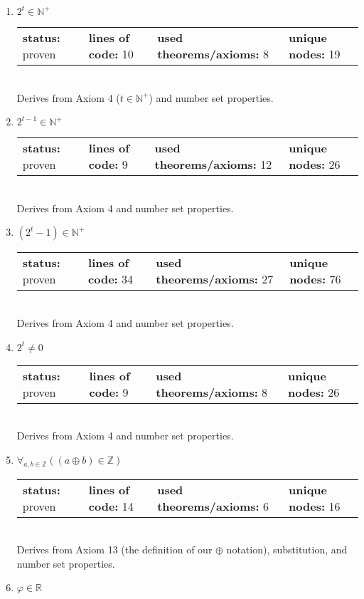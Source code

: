\documentclass{article}[12pt]
\begin{document}
\begin{enumerate}
\item $2^{t} \in \mathbb{N}^+$ \hfill \\
  \begin{tabular}{l | l | l | l}
    \textbf{status:} proven & \textbf{lines of code:} 10 & \textbf{used theorems/axioms:} 8 & \textbf{unique nodes:} 19
  \end{tabular} \hfill \\
  Derives from Axiom 4 ($t \in \mathbb{N}^+$) and number set properties.
\item $2^{t - 1} \in \mathbb{N}^+$ \hfill \\
  \begin{tabular}{l | l | l | l}
    \textbf{status:} proven & \textbf{lines of code:} 9 & \textbf{used theorems/axioms:} 12 & \textbf{unique nodes:} 26
  \end{tabular} \hfill \\
  Derives from Axiom 4 and number set properties.
\item $\left(2^{t} - 1\right) \in \mathbb{N}^+$ \hfill \\
  \begin{tabular}{l | l | l | l}
    \textbf{status:} proven & \textbf{lines of code:} 34 & \textbf{used theorems/axioms:} 27 & \textbf{unique nodes:} 76
  \end{tabular} \hfill \\
  Derives from Axiom 4 and number set properties.
\item $2^{t} \neq 0$ \hfill \\
  \begin{tabular}{l | l | l | l}
    \textbf{status:} proven & \textbf{lines of code:} 9 & \textbf{used theorems/axioms:} 8 & \textbf{unique nodes:} 26
  \end{tabular} \hfill \\
  Derives from Axiom 4 and number set properties.
\item $\forall_{a, b \in \mathbb{Z}} \left(\left(a \oplus b\right) \in \mathbb{Z}\right)$ \hfill \\
  \begin{tabular}{l | l | l | l}
    \textbf{status:} proven & \textbf{lines of code:} 14 & \textbf{used theorems/axioms:} 6 & \textbf{unique nodes:} 16
  \end{tabular} \hfill \\
  Derives from Axiom 13 (the definition of our $\oplus$ notation), substitution, and number set properties.
\item $\varphi \in \mathbb{R}$ \hfill \\

\end{enumerate}
\end{document}
